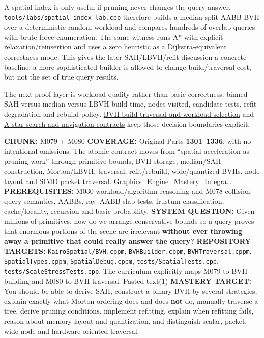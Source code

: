 A spatial index is only useful if pruning never changes the query answer. \texttt{tools/labs/spatial\_index\_lab.cpp} therefore builds a median-split AABB BVH over a deterministic random workload and compares hundreds of overlap queries with brute-force enumeration. The same witness runs A* with explicit relaxation/reinsertion and uses a zero heuristic as a Dijkstra-equivalent correctness mode. This gives the later SAH/LBVH/refit discussion a concrete baseline: a more sophisticated builder is allowed to change build/traversal cost, but not the set of true query results.

The next proof layer is workload quality rather than basic correctness: binned SAH versus median versus LBVH build time, nodes visited, candidate tests, refit degradation and rebuild policy. \hyperref[appendix-5653a7aea6bb]{BVH build traversal and workload selection} and \hyperref[appendix-5803241aa1a5]{A star search and navigation contracts} keep those decision boundaries explicit.

\textbf{CHUNK:} M079 + M080 \textbf{COVERAGE:} Original Parts \textbf{1301--1336}, with no intentional omissions. The atomic contract moves from ``spatial acceleration as pruning work'' through primitive bounds, BVH storage, median/SAH construction, Morton/LBVH, traversal, refit/rebuild, wide/quantized BVHs, node layout and SIMD packet traversal. Graphics\_Engine\_Mastery\_Integra\ldots{} \textbf{PREREQUISITES:} M030 workload/algorithm reasoning and M078 collision-query semantics, AABBs, ray--AABB slab tests, frustum classification, cache/locality, recursion and basic probability. \textbf{SYSTEM QUESTION:} Given millions of primitives, how do we arrange conservative bounds so a query proves that enormous portions of the scene are irrelevant \textbf{without ever throwing away a primitive that could really answer the query?} \textbf{REPOSITORY TARGETS:} \texttt{KairoSpatial/BVH.cppm}, \texttt{BVHBuilder.cppm}, \texttt{BVHTraversal.cppm}, \texttt{SpatialTypes.cppm}, \texttt{SpatialDebug.cppm}, \texttt{tests/SpatialTests.cpp}, \texttt{tests/ScaleStressTests.cpp}. The curriculum explicitly maps M079 to BVH building and M080 to BVH traversal. Pasted text(1) \textbf{MASTERY TARGET:} You should be able to derive SAH, construct a binary BVH by several strategies, explain exactly what Morton ordering does and does \textbf{not} do, manually traverse a tree, derive pruning conditions, implement refitting, explain when refitting fails, reason about memory layout and quantization, and distinguish scalar, packet, wide-node and hardware-oriented traversal.

